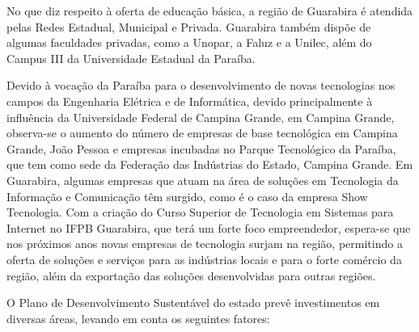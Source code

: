 
	No que diz respeito à oferta de educação básica, a região de Guarabira é atendida pelas Redes Estadual, Municipal e Privada. Guarabira tamb\'em disp\~oe de algumas faculdades privadas, como a Unopar, a Faluz e a Unilec, al\'em do Campus III da Universidade Estadual da Para\'iba.

	Devido \`a vocação da Para\'iba para o desenvolvimento de novas tecnologias nos campos da Engenharia Elétrica e de Informática, devido principalmente à influência da Universidade Federal de Campina Grande, em Campina Grande, observa-se o aumento do número de empresas de base tecnológica em Campina Grande, Jo\~ao Pessoa e empresas incubadas no Parque Tecnológico da Paraíba, que tem como sede da Federação das Indústrias do Estado, Campina Grande. Em Guarabira, algumas empresas que atuam na \'area de solu\c{c}\~oes em Tecnologia da Informa\c{c}\~ao e Comunica\c{c}\~ao t\^em surgido, como \'e o caso da empresa Show Tecnologia. Com a cria\c{c}\~ao do Curso Superior de Tecnologia em Sistemas para Internet no IFPB Guarabira, que ter\'a um forte foco empreendedor, espera-se que nos pr\'oximos anos novas empresas de tecnologia surjam na regi\~ao, permitindo a oferta de solu\c{c}\~oes e servi\c{c}os para as ind\'ustrias locais e para o forte com\'ercio da regi\~ao, al\'em da exporta\c{c}\~ao das solu\c{c}\~oes desenvolvidas para outras regi\~oes.


	O Plano de Desenvolvimento Sustentável do estado prevê investimentos em diversas áreas, levando em conta os seguintes fatores:

